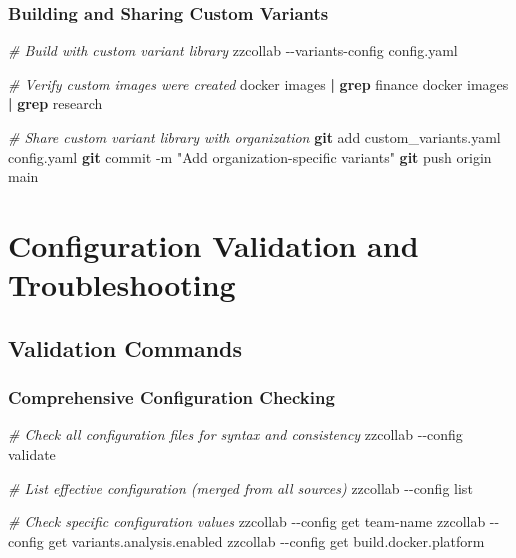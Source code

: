 \documentclass[
]{article}
\newenvironment{Shaded}{\begin{snugshade}}{\end{snugshade}}
\newcommand{\AttributeTok}[1]{\textcolor[rgb]{0.13,0.29,0.53}{#1}}
\newcommand{\CommentTok}[1]{\textcolor[rgb]{0.56,0.35,0.01}{\textit{#1}}}
\newcommand{\ExtensionTok}[1]{#1}
\newcommand{\FunctionTok}[1]{\textcolor[rgb]{0.13,0.29,0.53}{\textbf{#1}}}
\newcommand{\KeywordTok}[1]{\textcolor[rgb]{0.13,0.29,0.53}{\textbf{#1}}}
\newcommand{\NormalTok}[1]{#1}
\newcommand{\StringTok}[1]{\textcolor[rgb]{0.31,0.60,0.02}{#1}}
\begin{document}
\subsubsection{Building and Sharing Custom
Variants}\label{building-and-sharing-custom-variants}

\begin{Shaded}
\begin{Highlighting}[]
\CommentTok{\# Build with custom variant library}
\ExtensionTok{zzcollab} \AttributeTok{{-}{-}variants{-}config}\NormalTok{ config.yaml}

\CommentTok{\# Verify custom images were created}
\ExtensionTok{docker}\NormalTok{ images }\KeywordTok{|} \FunctionTok{grep}\NormalTok{ finance}
\ExtensionTok{docker}\NormalTok{ images }\KeywordTok{|} \FunctionTok{grep}\NormalTok{ research}

\CommentTok{\# Share custom variant library with organization}
\FunctionTok{git}\NormalTok{ add custom\_variants.yaml config.yaml}
\FunctionTok{git}\NormalTok{ commit }\AttributeTok{{-}m} \StringTok{"Add organization{-}specific variants"}
\FunctionTok{git}\NormalTok{ push origin main}
\end{Highlighting}
\end{Shaded}

\section{Configuration Validation and
Troubleshooting}\label{configuration-validation-and-troubleshooting}

\subsection{Validation Commands}\label{validation-commands}

\subsubsection{Comprehensive Configuration
Checking}\label{comprehensive-configuration-checking}

\begin{Shaded}
\begin{Highlighting}[]
\CommentTok{\# Check all configuration files for syntax and consistency}
\ExtensionTok{zzcollab} \AttributeTok{{-}{-}config}\NormalTok{ validate}

\CommentTok{\# List effective configuration (merged from all sources)}
\ExtensionTok{zzcollab} \AttributeTok{{-}{-}config}\NormalTok{ list}

\CommentTok{\# Check specific configuration values}
\ExtensionTok{zzcollab} \AttributeTok{{-}{-}config}\NormalTok{ get team{-}name}
\ExtensionTok{zzcollab} \AttributeTok{{-}{-}config}\NormalTok{ get variants.analysis.enabled}
\ExtensionTok{zzcollab} \AttributeTok{{-}{-}config}\NormalTok{ get build.docker.platform}
\end{Highlighting}
\end{Shaded}
\end{document}
